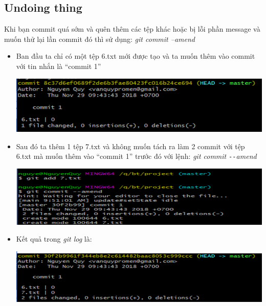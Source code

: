 \documentclass[12pt,a4paper]{report}
\begin{document}
\subsection{Undoing thing}
Khi bạn commit quá sớm và quên thêm các tệp khác hoặc bị lỗi phần message và muốn thử lại lần commit đó thì sử dụng: {\it git commit –amend}
\begin{itemize}
\item Ban đầu ta chỉ có một tệp 6.txt mới được tạo và ta muốn thêm vào commit với tin nhắn là “commit 1”

	\includegraphics[width=0.8\linewidth]{screenshot026}

	\label{fig:screenshot026}

\item Sau đó ta thêm 1 tệp 7.txt và không muốn tách ra làm 2 commit với tệp 6.txt mà muốn thêm vào “commit 1” trước đó với lệnh: {\it git commit \texttt{-{}-}amend}

	\includegraphics[width=0.8\linewidth]{screenshot027}

	\label{fig:screenshot027}

\item Kết quả trong \textit{git log} là:

	\includegraphics[width=0.8\linewidth]{screenshot028}
	
	\label{fig:screenshot028}
\end{itemize}
\end{document}
